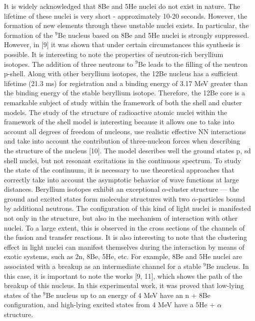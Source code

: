 \documentclass[
12pt, %
oneside, %
english, %
onehalfspacing, %
headsepline, %
]{MastersDoctoralThesis} %
\begin{document}
It is widely acknowledged that 8Be and 5He nuclei do not exist in nature. 
The lifetime of these nuclei is very short -  approximately 10-20 seconds.
 However, the formation of new elements through these unstable nuclei exists. 
 In particular, the formation of the $^{9}$Be nucleus based on 8Be and 5He nuclei is strongly suppressed. 
 However, in [9] it was shown that under certain circumstances this synthesis is possible. 
It is interesting to note the properties of neutron-rich beryllium isotopes. The addition of three neutrons to $^{9}$Be leads to the filling of the neutron p-shell. Along with other beryllium isotopes, the 12Be nucleus has a sufficient lifetime (21.3 ms) for registration and a binding energy of 3.17 MeV greater than the binding energy of the stable beryllium isotope. Therefore, the 12Be core is a remarkable subject of study within the framework of both the shell and cluster models. The study of the structure of radioactive atomic nuclei within the framework of the shell model is interesting because it allows one to take into account all degrees of freedom of nucleons, use realistic effective NN interactions and take into account the contribution of three-nucleon forces when describing the structure of the nucleus [10]. The model describes well the ground states p, sd shell nuclei, but not resonant excitations in the continuous spectrum. To study the state of the continuum, it is necessary to use theoretical approaches that correctly take into account the asymptotic behavior of wave functions at large distances.
Beryllium isotopes exhibit an exceptional $\alpha$-cluster structure — the ground and excited states form molecular structures with two $\alpha$-particles bound by additional neutrons. The configuration of this kind of light nuclei is manifested not only in the structure, but also in the mechanism of interaction with other nuclei. To a large extent, this is observed in the cross sections of the channels of the fusion and transfer reactions. It is also interesting to note that the clustering effect in light nuclei can manifest themselves during the interaction by means of exotic systems, such as 2n, 8Be, 5He, etc. For example, 8Be and 5He nuclei are associated with a breakup as an intermediate channel for a stable $^{9}$Be nucleus. In this case, it is important to note the works [9, 11],  which shows the path of the breakup of this nucleus. In this experimental work, it was proved that low-lying states of the $^{9}$Be nucleus up to an energy of 4 MeV have an n + 8Be configuration, and high-lying excited states from 4 MeV have a 5He + $\alpha$ structure.
\end{document}
